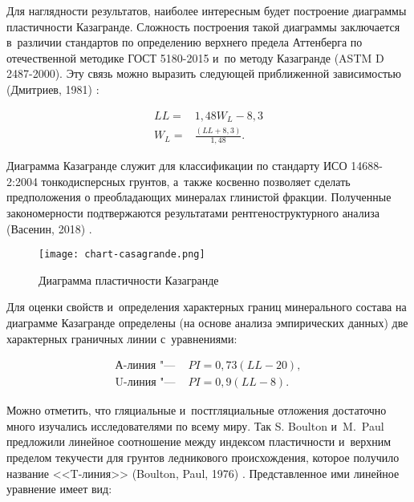 Для наглядности результатов, наиболее интересным будет построение диаграммы пластичности Казагранде. Сложность построения такой диаграммы заключается в~различии  стандартов по определению верхнего предела Аттенберга по отечественной методике ГОСТ 5180-2015 и~по методу Казагранде (ASTM D 2487-2000). Эту связь можно выразить следующей приближенной зависимостью (Дмитриев, 1981) \cite{dmitriev1981}:

\begin{subequations}
    \label{eq:wlll}
    \begin{align}
        \label{eq:ll}
        LL = & 1,48W_L - 8,3 \\
        \label{eq:wl}
        W_L = & \frac{(LL + 8,3)}{1,48}.
    \end{align}
\end{subequations}


Диаграмма Казагранде служит для классификации по стандарту ИСО 14688-2:2004 тонкодисперсных грунтов, а~также косвенно позволяет сделать предположения о преобладающих минералах глинистой фракции. Полученные закономерности подтвержаются результатами рентгеноструктурного анализа (Васенин, 2018) \cite{vasenin2018}.


\begin{figure}[ht]
    \small
    \centering
    \texttt{[image: chart-casagrande.png]}
    \caption{Диаграмма пластичности Казагранде} \label{Fig:Caz}
  \end{figure}


Для оценки свойств и~определения характерных границ минерального состава на диаграмме Казагранде определены (на основе анализа эмпирических данных) две характерных граничных линии с~уравнениями:

\begin{subequations}
    \label{eq:over}
    \begin{align}
        \label{eq:a}
        \text{А-линия "--- } & PI = 0,73 (LL - 20),
        \\
        \label{eq:u}
        \text{U-линия "--- } & PI = 0,9 (LL - 8).
    \end{align}
\end{subequations}

Можно отметить, что гляциальные и~постгляциальные отложения достаточно много изучались исследователями по всему миру. Так S. Boulton и~M.~Paul  предложили линейное соотношение между  индексом пластичности и~верхним пределом текучести  для грунтов ледникового происхождения, которое получило название <<T-линия>> (Boulton, Paul, 1976) \cite{boulton1976}. Представленное ими линейное уравнение имеет вид:

